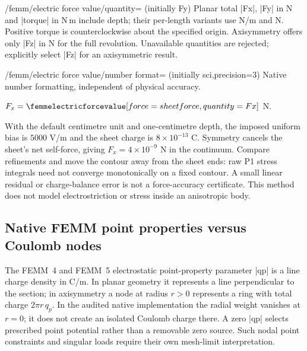 \begin{key}{/femm/electric force value/quantity= (initially Fy)}
Planar total |Fx|, |Fy| in N and |torque| in N\,m include depth; their per-length
variants use N/m and N. Positive torque is counterclockwise about the specified
origin. Axisymmetry offers only |Fz| in N for the full revolution. Unavailable
quantities are rejected; explicitly select |Fz| for an axisymmetric result.
\end{key}
\begin{key}{/femm/electric force value/number format= (initially sci,precision=3)}
Native number formatting, independent of physical accuracy.
\end{key}

\Needspace{13cm}
\begin{codeexample}[width=0pt]
\qquad
$F_x=\femmelectricforcevalue[force=sheet force,quantity=Fx]$ N.
\end{codeexample}
With the default centimetre unit and one-centimetre depth, the imposed uniform
bias is $5000$ V/m and the sheet charge is $8\times10^{-13}$ C. Symmetry cancels
the sheet's net self-force, giving $F_x=4\times10^{-9}$ N in the continuum.
Compare refinements and move the contour away from the sheet ends: raw P1
stress integrals need not converge monotonically on a fixed contour. A small
linear residual or charge-balance error is not a force-accuracy certificate.
This method does not model electrostriction or stress inside an anisotropic body.

\subsection{Native FEMM point properties versus Coulomb nodes}
The FEMM~4 and FEMM~5 electrostatic point-property parameter |qp| is a line
charge density in C/m. In planar geometry it represents a line perpendicular
to the section; in axisymmetry a node at radius $r>0$ represents a ring with
total charge $2\pi r\,q_p$. In the audited native implementation the radial
weight vanishes at $r=0$; it does not create an isolated Coulomb charge there.
A zero |qp| selects prescribed point potential rather than a removable zero
source. Such nodal point constraints and singular loads require their own
mesh-limit interpretation.

